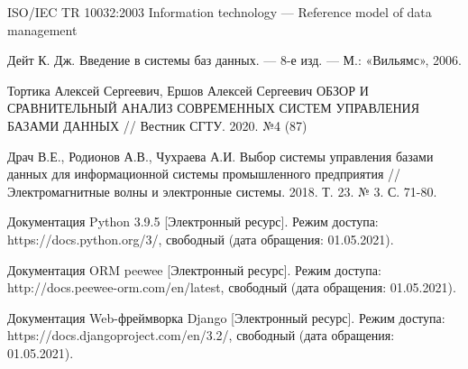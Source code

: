 \documentclass[10pt,a4paper]{report}
\begin{document}
	\makeatletter %
	\def\@biblabel#1{#1. }
	\makeatother
	\begin{thebibliography}{7}
		 ISO/IEC TR 10032:2003 Information technology — Reference model of data management
		
		 Дейт К. Дж. Введение в системы баз данных. — 8-е изд. — М.:
		«Вильямс», 2006.
				
		 Тортика Алексей Сергеевич, Ершов Алексей Сергеевич ОБЗОР И СРАВНИТЕЛЬНЫЙ АНАЛИЗ СОВРЕМЕННЫХ СИСТЕМ УПРАВЛЕНИЯ БАЗАМИ ДАННЫХ // Вестник СГТУ. 2020. №4 (87)
		
		 Драч В.Е., Родионов А.В., Чухраева А.И. Выбор системы управления базами данных для информационной системы промышленного предприятия // Электромагнитные волны и электронные системы. 2018. Т. 23. № 3. С. 71-80.
		
		 Документация Python 3.9.5 [Электронный ресурс]. Режим доступа: https://docs.python.org/3/, свободный (дата обращения: 01.05.2021).
		
		 Документация ORM peewee [Электронный ресурс]. Режим доступа:
		 http://docs.peewee-orm.com/en/latest, свободный (дата обращения: 01.05.2021).
		 
 		 Документация Web-фреймворка Django [Электронный ресурс]. Режим доступа: https://docs.djangoproject.com/en/3.2/, свободный (дата обращения: 01.05.2021).
	\end{thebibliography}
\end{document}

